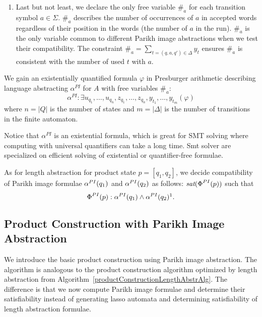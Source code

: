 \begin{enumerate}
    \item \label{clauses:hash_original} Last but not least, we declare the only free variable $\#_a$ for each transition symbol $ a \in \Sigma$. $\#_a$ describes the number of occurrences of $a$ in accepted words regardless of their position in the words (the number of $a$ in the run). $\#_a$ is the only variable common to different Parikh image abstractions when we test their compatibility. The constraint $\#_a = \sum_{t = (q, a, q') \in \Delta} y_t$ ensures $\#_a$ is consistent with the number of used $t$ with $a$.

\end{enumerate}

We gain an existentially quantified formula $\varphi$ in Presburger arithmetic describing language abstracting $\alpha^{PI}$ for $A$ with free variables $\#_a$:
$$ \alpha^{PI} : \exists u_{q_1},\ldots,u_{q_n},z_{q_1},\ldots,z_{q_n},y_{t_1},\ldots,y_{t_m} ( \varphi ) $$
where $n = \lvert Q \rvert$ is the number of states and $m = \lvert \Delta \rvert$ is the number of transitions in the finite automaton.

Notice that $\alpha^{PI}$ is an existential formula, which is great for SMT solving where computing with universal quantifiers can take a long time. Smt solver are specialized on efficient solving of existential or quantifier-free formulae.

As for length abstraction for product state $p = [q_1, q_2]$, we decide compatibility of Parikh image formulae $\alpha^{PI}(q_1)$ and $\alpha^{PI}(q_2)$ as follows: $\emph{sat}(\emph{$\Phi$}^{PI}(p))$ such that
\[
    \compatPI{p} : \abstPI{q_1} \wedge \abstPI{q_2}\footnotemark \text{.}
\]

\subsection{Product Construction with Parikh Image Abstraction}

We introduce the basic product construction using Parikh image abstraction. The algorithm is analogous to the product construction algorithm optimized by length abstraction from Algorithm~\ref{productConstructionLengthAbstrAlg}. The difference is that we now compute Parikh image formulae and determine their satisfiability instead of generating lasso automata and determining satisfiability of length abstraction formulae.

